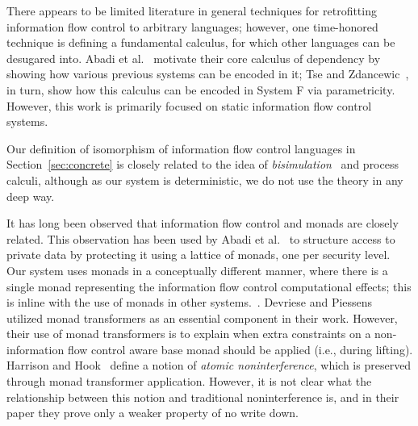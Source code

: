 There appears to be limited literature in general techniques for
retrofitting information flow control to arbitrary languages; however,
one time-honored technique is defining a fundamental calculus, for which
other languages can be desugared into.  Abadi et al.~\cite{abadi+:core}
motivate their core calculus of dependency by showing how various
previous systems can be encoded in it; Tse and
Zdancewic~\cite{Tse:Zdancewic:ICFP04}, in turn, show how this calculus
can be encoded in System F via parametricity.  However, this work is
primarily focused on static information flow control systems.

Our definition of isomorphism of information flow control languages in
Section~\ref{sec:concrete} is closely related to the idea of
\emph{bisimulation}~\cite{Milner:1989:CC:534666} and process calculi,
although as our system is deterministic, we do not use the theory in any
deep way.

It has long been observed that information flow control and monads are
closely related.  This observation has been used by Abadi et
al.~\cite{abadi+:core} to structure access to private data by protecting
it using a lattice of monads, one per security level.  Our system uses
monads in a conceptually different manner, where there is a single monad
representing the information flow control computational effects; this
is inline with the use of monads in other systems.~\cite{Harrison05,lio,Devriese:2011}.
Devriese and Piessens~\cite{Devriese:2011} utilized monad
transformers as an essential component in their work.  However, their use
of monad transformers is to explain when extra constraints on a non-information
flow control aware base monad should be applied (i.e., during lifting).
Harrison and Hook~\cite{Harrison05} define a notion of \emph{atomic noninterference},
which is preserved through monad transformer application.  However, it is not
clear what the relationship between this notion and traditional noninterference is,
and in their paper they prove only a weaker property of no write down.

